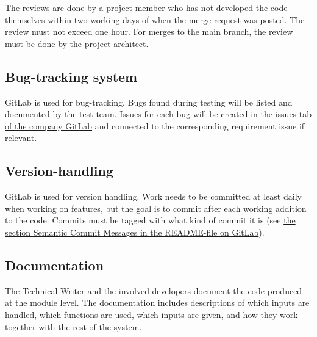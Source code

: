 The reviews are done by a project member who has not developed the code themselves within two working days of when the merge request was posted. The review must not exceed one hour. For merges to the main branch, the review must be done by the project architect.

\subsection{Bug-tracking system}
GitLab is used for bug-tracking. Bugs found during testing will be listed and documented by the test team. Issues for each bug will be created in  \href{https://gitlab.liu.se/tddc88-company-1-2021/deploy/-/issues}{the issues tab of the company GitLab} and connected to the corresponding requirement issue if relevant.

\subsection{Version-handling}
GitLab is used for version handling. Work needs to be committed at least daily when working on features, but the goal is to commit after each working addition to the code. Commits must be tagged with what kind of commit it is (see \href{https://gitlab.liu.se/tddc88-company-1-2021/deploy/-/tree/main#semantic-commit-messages}{the section Semantic Commit Messages in the README-file on GitLab}).

\subsection{Documentation}
The Technical Writer and the involved developers document the code produced at the module level. The documentation includes descriptions of which inputs are handled, which functions are used, which inputs are given, and how they work together with the rest of the system.